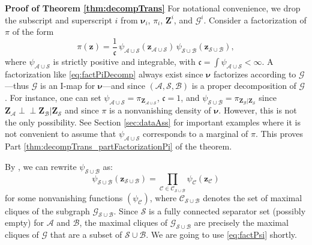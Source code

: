 \documentclass[twoside,11pt]{article}
\newcommand{\orth}{ \perp\!\!\!\perp }  %
\newcommand{\genm}{\boldsymbol{\nu} }   %
\newcommand{\Bc}{\mathcal{B}}
\newcommand{\Cc}{\mathcal{C}}
\newcommand{\Ac}{\mathcal{A}}
\newcommand{\Sc}{\mathcal{S}}
\newcommand{\Zb}{\boldsymbol{Z}}
\newcommand{\zb}{\boldsymbol{z}}
\newcommand{\Gcb}{\boldsymbol{\mathcal{G}}}
\newcommand{\Ccb}{\boldsymbol{\mathcal{C}}}
\newcommand{\Aset}{ \Ac }
\newcommand{\Bset}{ \Bc }
\newcommand{\Sset}{ \Sc }
\begin{document}
\noindent
{\bf Proof of Theorem \ref{thm:decompTrans}}
For notational convenience, we drop the subscript and superscript $i$ from
$\genm_i$, $\pi_i$, $\Zb^i$, and $\Gcb^i$.
Consider a factorization of $\pi$ of the form
\begin{equation} \label{eq:factPiDecomp}
  \pi(\zb)=\frac{1}{\mathfrak{c}} \, \psi_{\Aset \cup \Sset}(\zb_{\Aset \cup \Sset}) \, 
    \psi_{\Sset \cup \Bset }(\zb_{ \Sset \cup \Bset }),
\end{equation}
where $\psi_{\Aset \cup \Sset}$ 
is strictly positive and integrable, 
with $\mathfrak{c} = \int \psi_{ \Aset \cup \Sset} < \infty$.
%
%
%
%
%
%
A factorization like \eqref{eq:factPiDecomp} always exist since 
$\genm$ factorizes according to $\Gcb$---thus $\Gcb$ is 
an I-map for $\genm$---and since
$(\Aset, \Sset, \Bset)$
is a proper decomposition of $\Gcb$. %
%
%
For instance, one can set %
$\psi_{\Aset \cup \Sset} = \pi_{\Zb_{\Aset \cup \Sset}}$,
$\mathfrak{c}=1$, 
and $\psi_{\Sset \cup \Bset } = \pi_{\Zb_{\Bset} \vert \Zb_{\Sset}}$
since $\Zb_{\Aset} \orth \Zb_{\Bset} \vert \Zb_{\Sset}$ and since
$\pi$ is a nonvanishing density of $\genm$.
%
However, this is not the only possibility.
See Section \ref{sec:dataAss} for important
examples where it is not convenient to assume that %
$\psi_{\Aset \cup \Sset}$ corresponds to a marginal of $\pi$.
%
This proves Part \ref{thm:decompTrans_partFactorizationPi} 
of the theorem.


%
%
%
%
%
%
By \citep[Prop.~3.16]{lauritzen1996graphical}, 
%
%
%
%
%
%
%
%
%
%
%
%
%
%
%
%
%
%
%
we can rewrite $\psi_{\Sset \cup \Bset}$ as:
%
%
\begin{equation} \label{eq:factPsi}
\psi_{\Sset \cup \Bset }(\zb_{ \Sset \cup \Bset }) = \prod_{\Cc \in \Ccb_{\Sset \cup \Bset}} 
\psi_{\Cc}(\zb_{\Cc})
\end{equation}
for some nonvanishing
%
functions $(\psi_{\Cc})$, where $\Ccb_{\Sset \cup \Bset}$ denotes the set
of maximal cliques of the subgraph $\Gcb_{\Sset \cup \Bset}$.
%
Since $\Sset$ is a fully connected %
separator set (possibly empty) for $\Aset$ and $\Bset$, 
the maximal cliques of $\Gcb_{\Sset \cup \Bset}$ are precisely the maximal cliques of
$\Gcb$ that are a subset of $\Sset \cup \Bset$.
We are going to use  \eqref{eq:factPsi} shortly.
%
%
%
%
%
%
%
%
\end{document}
